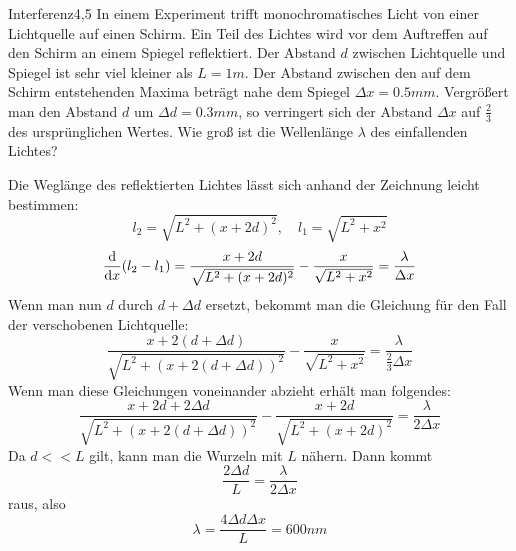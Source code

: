 \begin{problem}{Interferenz}{4,5}
In einem Experiment trifft monochromatisches Licht von einer Lichtquelle auf einen Schirm. Ein Teil des Lichtes wird vor dem Auftreffen auf den Schirm an einem Spiegel reflektiert. Der Abstand $d$ zwischen Lichtquelle und Spiegel ist sehr viel kleiner als $L=1 \unit{m}$. Der Abstand zwischen den auf dem Schirm entstehenden Maxima beträgt nahe dem Spiegel $\Delta x=0.5 \unit{mm}$. Vergrößert man den Abstand $d$ um $\Delta d = 0.3 \unit{mm}$, so verringert sich der Abstand $\Delta x$ auf $\frac 23$ des ursprünglichen Wertes. Wie groß ist die Wellenlänge $\lambda$ des einfallenden Lichtes?
\begin{solution}
Die Weglänge des reflektierten Lichtes lässt sich anhand der Zeichnung leicht bestimmen:
\[
l_2=\sqrt{L^2+(x+2d)^2}, \quad l_1=\sqrt{L^2+x^2}
\]
\[
\frac{\mathrm{d}}{\mathrm{d} x}(l_2-l_1)=\frac{x+2d}{\sqrt{L^2+(x+2d)^2}}-\frac{x}{\sqrt{L^2+x^2}}=\frac{\lambda}{\Delta x}
\]
Wenn man nun $d$ durch $d+\Delta d$ ersetzt, bekommt man die Gleichung für den Fall der verschobenen Lichtquelle:
\[
\frac{x+2(d+\Delta d)}{\sqrt{L^2+(x+2(d+\Delta d))^2}}-\frac{x}{\sqrt{L^2+x^2}}=\frac{\lambda}{\frac 23 \Delta x}
\]
Wenn man diese Gleichungen voneinander abzieht erhält man folgendes:
\[
\frac{x+2 d+2 \Delta d}{\sqrt{L^2+(x+2(d+\Delta d))^2}} - \frac{x+2d}{\sqrt{L^2+(x+2d)^2}} = \frac{\lambda}{2 \Delta x}
\]
Da $d<<L$ gilt, kann man die Wurzeln mit $L$ nähern. Dann kommt
\[
\frac{2 \Delta d}{L}=\frac{\lambda}{2 \Delta x}
\]
raus, also
\[
\lambda=\frac{4 \Delta d \Delta x}{L}=600\unit{nm}
\]
\end{solution}
\end{problem}

